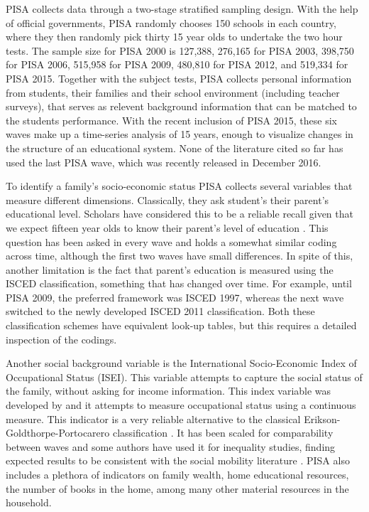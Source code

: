 \documentclass[11pt, a4paper]{article}\usepackage[]{graphicx}\usepackage[]{color}
\begin{document}
PISA collects data through a two-stage stratified sampling design. With the help of official governments, PISA randomly chooses 150 schools in each country, where they then randomly pick thirty 15 year olds to undertake the two hour tests. The sample size for PISA 2000 is 127,388, 276,165 for PISA 2003, 398,750 for PISA 2006, 515,958 for PISA 2009, 480,810 for PISA 2012, and 519,334 for PISA 2015. Together with the subject tests, PISA collects personal information from students, their families and their school environment (including teacher surveys), that serves as relevent background information that can be matched to the students performance. With the recent inclusion of PISA 2015, these six waves make up a time-series analysis of 15 years, enough to visualize changes in the structure of an educational system. None of the literature cited so far has used the last PISA wave, which was recently released in December 2016.

To identify a family's socio-economic status PISA collects several variables that measure different dimensions. Classically, they ask student's their parent's educational level. Scholars have considered this to be a reliable recall given that we expect fifteen year olds to know their parent's level of education \citep{reardon2011}. This question has been asked in every wave and holds a somewhat similar coding across time, although the first two waves have small differences. In spite of this, another limitation is the fact that parent's education is measured using the ISCED classification, something that has changed over time. For example, until PISA 2009, the preferred framework was ISCED 1997, whereas the next wave switched to the newly developed ISCED 2011 classification. Both these classification schemes have equivalent look-up tables, but this requires a detailed inspection of the codings.

Another social background variable is the International Socio-Economic Index of Occupational Status (ISEI). This variable attempts to capture the social status of the family, without asking for income information. This index variable was developed by \citet{ganzeboom1996, ganzeboom2010} and it attempts to measure occupational status using a continuous measure. This indicator is a very reliable alternative to the  classical Erikson-Goldthorpe-Portocarero classification \citet{erikson1979}. It has been scaled for comparability between waves and some authors have used it for inequality studies, finding expected results to be consistent with the social mobility literature \citep{anna2016_global}. PISA also includes a plethora of indicators on family wealth, home educational resources, the number of books in the home, among many other material resources in the household.
\end{document}
